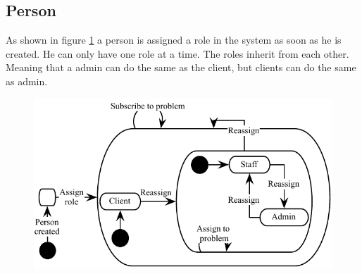 \subsection{Person}
As shown in figure \ref{fig:Klasse_diagram_person} a person is assigned a role in the system as soon as he is created. He can only have one role at a time. The roles inherit from each other. Meaning that a admin can do the same as the client, but clients can do the same as admin. 
\begin{figure}[H]
\begin{center}
\includegraphics[scale=1]{input/problem_domain_analysis/Klassediagram_person.pdf}
\label{fig:Klasse_diagram_person}
\end{center}
\end{figure}

